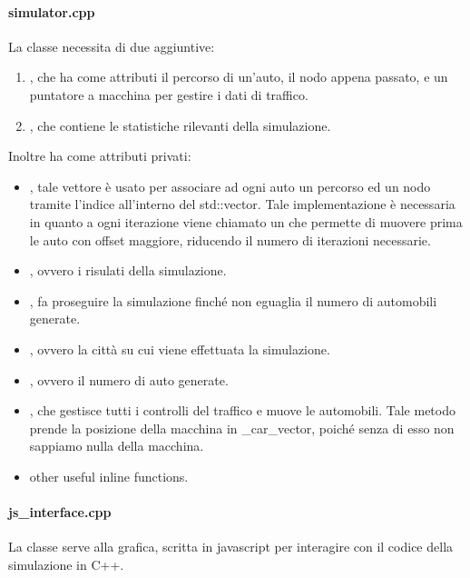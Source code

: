 \documentclass[main.tex]{subfiles}
\begin{document}
    \paragraph{simulator.cpp}
        La classe  necessita di due  aggiuntive:
        \begin{enumerate}
            \item {}, che ha come attributi il percorso di un'auto, il nodo appena passato, e un puntatore a macchina per gestire i dati di traffico.
            \item {}, che contiene le statistiche rilevanti della simulazione.
        \end{enumerate}
        Inoltre ha come attributi privati:
        \begin{itemize}
            \item {}, tale vettore è usato per associare ad ogni auto un percorso ed un nodo tramite l'indice 
                all'interno del std::vector. Tale implementazione è necessaria in quanto a ogni iterazione viene chiamato un  che permette di 
                muovere prima le auto con offset maggiore, riducendo il numero di iterazioni necessarie.
            \item {}, ovvero i risulati della simulazione.
            \item {}, fa proseguire la simulazione finché non eguaglia il numero di automobili generate.
            \item {}, ovvero la città su cui viene effettuata la simulazione.
            \item {}, ovvero il numero di auto generate.
            \item {}, che gestisce tutti i controlli del traffico e muove le automobili.
                Tale metodo prende la posizione della macchina in \_car\_vector, poiché senza di esso non sappiamo nulla della macchina.
            \item other useful inline functions.
        \end{itemize}
    \paragraph{js\_interface.cpp} 
        La classe  serve alla grafica, scritta in javascript per interagire con il codice della simulazione in C++.
\end{document}
